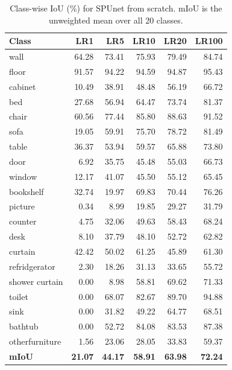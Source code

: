 \begin{table}[htbp]
\centering
\caption{Class-wise IoU (\%) for SPUnet from scratch. mIoU is the unweighted mean over all 20 classes.}
\label{tab:classwise-spunet-scratch}
\begin{tabular}{lrrrrr}
\hline
Class & LR1 & LR5 & LR10 & LR20 & LR100 \\
\hline
wall & 64.28 & 73.41 & 75.93 & 79.49 & 84.74 \\
floor & 91.57 & 94.22 & 94.59 & 94.87 & 95.43 \\
cabinet & 10.49 & 38.91 & 48.48 & 56.19 & 66.72 \\
bed & 27.68 & 56.94 & 64.47 & 73.74 & 81.37 \\
chair & 60.56 & 77.44 & 85.80 & 88.63 & 91.52 \\
sofa & 19.05 & 59.91 & 75.70 & 78.72 & 81.49 \\
table & 36.37 & 53.94 & 59.57 & 65.88 & 73.80 \\
door & 6.92 & 35.75 & 45.48 & 55.03 & 66.73 \\
window & 12.17 & 41.07 & 45.50 & 55.12 & 65.45 \\
bookshelf & 32.74 & 19.97 & 69.83 & 70.44 & 76.26 \\
picture & 0.34 & 8.99 & 19.85 & 29.27 & 31.79 \\
counter & 4.75 & 32.06 & 49.63 & 58.43 & 68.24 \\
desk & 8.10 & 37.79 & 48.10 & 52.72 & 62.82 \\
curtain & 42.42 & 50.02 & 61.25 & 45.89 & 61.30 \\
refridgerator & 2.30 & 18.26 & 31.13 & 33.65 & 55.72 \\
shower curtain & 0.00 & 8.98 & 58.81 & 69.62 & 71.33 \\
toilet & 0.00 & 68.07 & 82.67 & 89.70 & 94.88 \\
sink & 0.00 & 31.82 & 49.22 & 64.77 & 68.51 \\
bathtub & 0.00 & 52.72 & 84.08 & 83.53 & 87.38 \\
otherfurniture & 1.56 & 23.06 & 28.05 & 33.83 & 59.37 \\
\hline
\textbf{mIoU} & \textbf{21.07} & \textbf{44.17} & \textbf{58.91} & \textbf{63.98} & \textbf{72.24} \\
\hline
\end{tabular}
\end{table}
